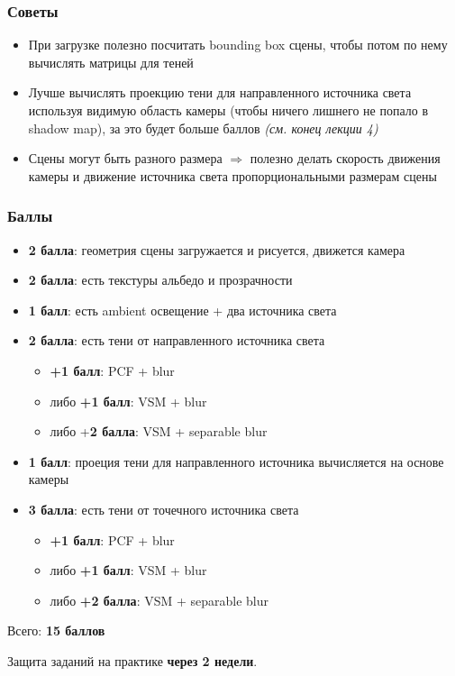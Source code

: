 \documentclass[10pt]{beamer}
\begin{document}
\begin{frame}[fragile]
\frametitle{Советы}
\begin{itemize}
\item При загрузке полезно посчитать bounding box сцены, чтобы потом по нему вычислять матрицы для теней
\item Лучше вычислять проекцию тени для направленного источника света используя видимую область камеры (чтобы ничего лишнего не попало в shadow map), за это будет больше баллов \textit{(см. конец лекции 4)}
\item Сцены могут быть разного размера \begin{math}\Rightarrow\end{math} полезно делать скорость движения камеры и движение источника света пропорциональными размерам сцены
\end{itemize}
\end{frame}

\begin{frame}[fragile]
\frametitle{Баллы}
\footnotesize
\begin{itemize}
\item \textbf{2 балла}: геометрия сцены загружается и рисуется, движется камера
\item \textbf{2 балла}: есть текстуры альбедо и прозрачности
\item \textbf{1 балл}: есть ambient освещение + два источника света
\item \textbf{2 балла}: есть тени от направленного источника света
\begin{itemize}
\item \textbf{+1 балл}: PCF + blur
\item либо \textbf{+1 балл}: VSM + blur
\item либо +\textbf{2 балла}: VSM + separable blur
\end{itemize}
\item \textbf{1 балл}: проеция тени для направленного источника вычисляется на основе камеры
\item \textbf{3 балла}: есть тени от точечного источника света
\begin{itemize}
\item \textbf{+1 балл}: PCF + blur
\item либо \textbf{+1 балл}: VSM + blur
\item либо \textbf{+2 балла}: VSM + separable blur
\end{itemize}
\end{itemize}
Всего: \textbf{15 баллов}

Защита заданий на практике \textbf{через 2 недели}.
\end{frame}
\end{document}
